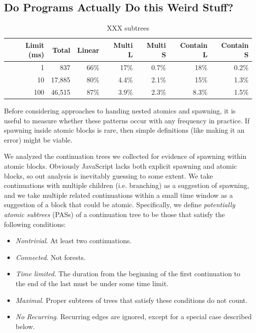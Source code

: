 \documentclass[acmsmall,anonymous,review]{acmart}\settopmatter{printfolios=true,printccs=false,printacmref=false}
\begin{document}

\subsection{Do Programs Actually Do this Weird Stuff?}

\begin{table}
  \centering
  \begin{tabular}{|r|r|r|r|r|r|r|}
    \hline
    Limit (ms) &  Total & Linear & Multi L & Multi S & Contain L & Contain S \\
    \hline
    1          &    837 &   66\% &    17\% &   0.7\% &      18\% &     0.2\% \\
    \hline
    10         & 17,885 &   80\% &   4.4\% &   2.1\% &      15\% &     1.3\% \\
    \hline
    100        & 46,515 &   87\% &   3.9\% &   2.3\% &     8.3\% &     1.5\% \\
    \hline
  \end{tabular}
  \caption{XXX subtrees}
  \label{table:subtrees}
\end{table}

Before considering approaches to handing nested atomics and spawning, it is useful to measure whether these patterns occur with any frequency in practice.
If spawning inside atomic blocks is rare, then simple definitions (like making it an error) might be viable.

We analyzed the continuation trees we collected for evidence of spawning within atomic blocks.
Obviously JavaScript lacks both explicit spawning and atomic blocks, so out analysis is inevitably guessing to some extent.
We take continuations with multiple children (i.e. branching) as a suggestion of spawning, and we take multiple related continuations within a small time window as a suggestion of a block that could be atomic.
Specifically, we define \emph{potentially atomic subtrees} (PASs) of a continuation tree to be those that satisfy the following conditions:

\begin{itemize}
\item \emph{Nontrivial}. At least two continuations.
\item \emph{Connected}. Not forests.
\item \emph{Time limited}. The duration from the beginning of the first continuation to the end of the last must be under some time limit.
\item \emph{Maximal}. Proper subtrees of trees that satisfy these conditions do not count.
\item \emph{No Recurring}. Recurring edges are ignored, except for a special case described below.
\end{itemize}
\end{document}
